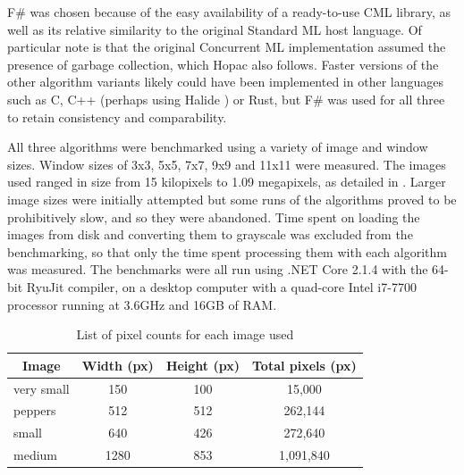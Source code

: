 F\# was chosen because of the easy availability of a ready-to-use CML library, as well as its relative similarity to the original Standard ML host language.  Of particular note is that the original Concurrent ML implementation assumed the presence of garbage collection, which Hopac also follows.  Faster versions of the other algorithm variants likely could have been implemented in other languages such as C, C++ (perhaps using Halide \cite{Ragan-Kelley2017}) or Rust, but F\# was used for all three to retain consistency and comparability.  

All three algorithms were benchmarked using a variety of image and window sizes.  Window sizes of 3x3, 5x5, 7x7, 9x9 and 11x11 were measured.  The images used ranged in size from 15 kilopixels to 1.09 megapixels, as detailed in .  Larger image sizes were initially attempted but some runs of the algorithms proved to be prohibitively slow, and so they were abandoned.  Time spent on loading the images from disk and converting them to grayscale was excluded from the benchmarking, so that only the time spent processing them with each algorithm was measured.  The benchmarks were all run using .NET Core 2.1.4 with the 64-bit RyuJit compiler, on a desktop computer with a quad-core Intel i7-7700 processor running at 3.6GHz and 16GB of RAM.

\begin{table}
\centering
\caption{List of pixel counts for each image used}
\label{tab:median:pixelcounts}
\begin{tabular}{@{}lccc@{}}
\toprule
\multicolumn{1}{c}{\textbf{Image}} & \multicolumn{1}{c}{\textbf{Width (px)}} & \multicolumn{1}{c}{\textbf{Height (px)}} & \multicolumn{1}{c}{\textbf{Total pixels (px)}} \\ \midrule
very small                         & 150                                     & 100                                      & 15,000                                         \\
peppers                            & 512                                     & 512                                      & 262,144                                        \\
small                              & 640                                     & 426                                      & 272,640                                        \\
medium                             & 1280                                    & 853                                      & 1,091,840                                      \\ \bottomrule
\end{tabular}
\end{table}

